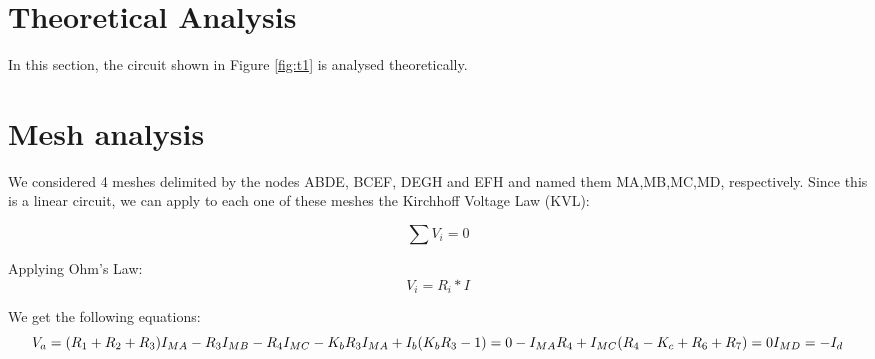\section{Theoretical Analysis}
\label{sec:analysis}

In this section, the circuit shown in Figure \ref{fig:t1} is analysed
theoretically.

\section{Mesh analysis}
We considered 4 meshes delimited by the nodes ABDE, BCEF, DEGH and EFH and named them MA,MB,MC,MD, respectively. Since this is a linear circuit, we can apply to each one of these meshes the Kirchhoff Voltage Law (KVL):


\begin{equation}
  \sum V_i = 0
  \label{eq:KVL}
\end{equation}

Applying Ohm's Law:
\begin{equation}
  V_i= R_i * I
  \label{eq:OhmLaw}
\end{equation}

We get the following equations:
\begin{equation}
    
     V_a = (R_1+R_2+R_3)I_{MA} - R_3I_{MB} - R_4I_{MC}\\
  
    -K_bR_3I_{MA} + I_b(K_bR_3-1)=0\\
  
    -I_{MA}R_4 + I_{MC}(R_4-K_c+R_6+R_7)=0\\
   
    I_{MD}= -I_d

  \label{eq:malhas}
\end{equation}

